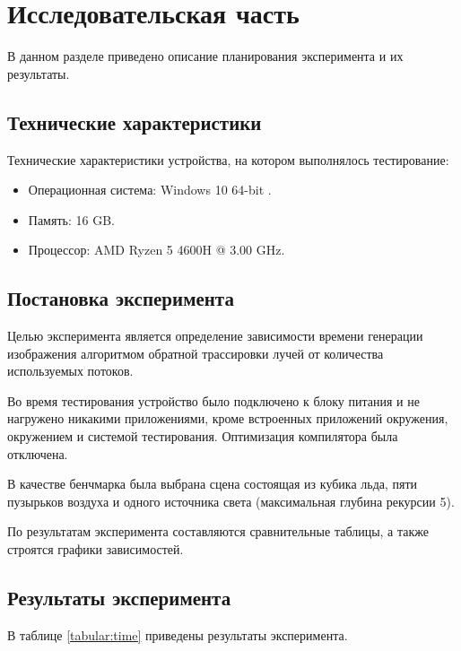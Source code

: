 \chapter{Исследовательская часть}

В данном разделе приведено описание планирования эксперимента и их результаты.

\section{Технические характеристики}

Технические характеристики устройства, на котором выполнялось тестирование:

\begin{itemize}
	\item Операционная система: Windows 10 64-bit \cite{windows}.
	\item Память: 16 GB.
	\item Процессор: AMD Ryzen 5 4600H \cite{amd} @ 3.00 GHz.
\end{itemize}

\section{Постановка эксперимента}

Целью эксперимента является определение зависимости времени генерации изображения алгоритмом обратной трассировки лучей от количества используемых потоков.

Во время тестирования устройство было подключено к блоку питания и не нагружено никакими приложениями, кроме встроенных приложений окружения, окружением и системой тестирования. Оптимизация компилятора была отключена.

В качестве бенчмарка была выбрана сцена состоящая из кубика льда, пяти пузырьков воздуха и одного источника света (максимальная глубина рекурсии 5).

По результатам эксперимента составляются сравнительные таблицы, а также строятся графики зависимостей.

\captionsetup{singlelinecheck = false, justification=raggedright}

\newpage

\section{Результаты эксперимента}

В таблице \ref{tabular:time} приведены результаты эксперимента.

